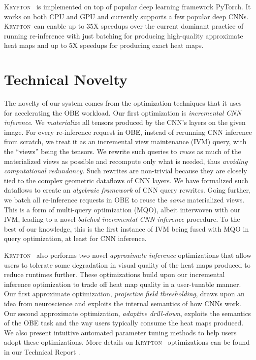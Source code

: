 \documentclass{article}
\newcommand{\system}{\textsc{Krypton}}
\begin{document}
\system~ is implemented on top of popular deep learning framework PyTorch. It works on both CPU and GPU and currently supports a few popular deep CNNs. \system ~can enable up to $35$X speedups over the current dominant practice of running re-inference with just batching for producing high-quality approximate heat maps and up to $5$X speedups for producing exact heat maps.


\section{Technical Novelty}
The novelty of our system comes from the optimization techniques that it uses for accelerating the OBE workload.
Our first optimization is \textit{incremental CNN inference}. We \textit{materialize} all tensors produced by the CNN's layers on the given image. For every re-inference request in OBE, instead of rerunning CNN inference from scratch, we treat it as an incremental view maintenance (IVM) query, with the ``views'' being the tensors. We rewrite such queries to \textit{reuse} as much of the materialized views as possible and recompute only what is needed, thus \textit{avoiding computational redundancy}. Such rewrites are non-trivial because they are closely tied to the complex geometric dataflows of CNN layers. We have formalized such dataflows to create an \textit{algebraic framework} of CNN query rewrites. Going further, we batch all re-inference requests in OBE to reuse the \textit{same} materialized views. This is a form of multi-query optimization (MQO), albeit interwoven with our IVM, leading to a novel \textit{batched incremental CNN inference} procedure. To the best of our knowledge, this is the first instance of IVM being fused with MQO in query optimization, at least for CNN inference.

\system~ also performs two novel \textit{approximate inference} optimizations that allow users to tolerate some degradation in visual quality of the heat maps produced to reduce runtimes further. These optimizations build upon our incremental inference optimization to trade off heat map quality in a user-tunable manner. Our first approximate optimization, \textit{projective field thresholding}, draws upon an idea from neuroscience and exploits the internal semantics of how CNNs work. Our second approximate optimization, \textit{adaptive drill-down}, exploits the semantics of the OBE task and the way users typically consume the heat maps produced. We also present intuitive automated parameter tuning methods to help users adopt these optimizations.
More details on \system~ optimizations can be found in our Technical Report \cite{krypton}.
\end{document}
